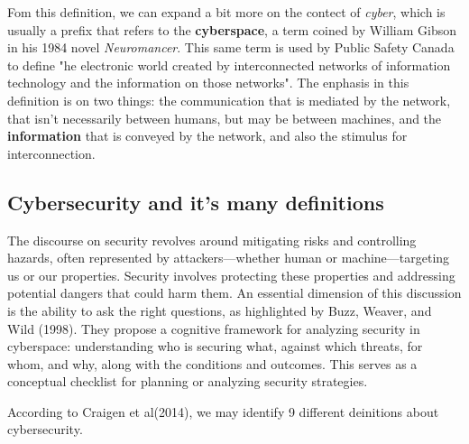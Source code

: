 Fom this definition, we can expand a bit more on the contect of
\textit{cyber}, which is usually a prefix that refers to the
\textbf{cyberspace}, a term coined by William Gibson in his 1984 novel 
\textit{Neuromancer}. This same term is used by Public Safety Canada 
to define "he electronic world created by interconnected networks of
information technology and the information on those networks".
The enphasis in this definition is on two things: the communication
that is mediated by the network, that isn't necessarily between
humans, but may be between machines, and the \textbf{information} that
is conveyed by the network, and also the stimulus for interconnection.

\subsection{Cybersecurity and it's many definitions}

The discourse on security revolves around mitigating risks and
controlling hazards, often represented by attackers—whether human or
machine—targeting us or our properties. Security involves protecting
these properties and addressing potential dangers that could harm
them. An essential dimension of this discussion is the ability to ask
the right questions, as highlighted by Buzz, Weaver, and Wild (1998).
They propose a cognitive framework for analyzing security in
cyberspace: understanding who is securing what, against which threats,
for whom, and why, along with the conditions and outcomes. This serves
as a conceptual checklist for planning or analyzing security
strategies.

According to Craigen et al(2014), we may identify 9 different
deinitions about cybersecurity.

